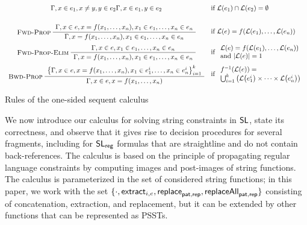 \begin{table}
\begin{gather*}
\begin{array}{cl}
      {\seqq{x \in e_1, x \not= y, y \in e_2}}
      {\seqq{x \in e_1, y \in e_2}}
      &
        \text{if~} \lang{e_1} \cap \lang{e_2} = \emptyset
      \\[4ex]
      \infer[Fwd-Prop]
      {\seqq{x = f(x_1, \ldots, x_n), x_1 \in e_1, \ldots, x_n \in e_n}}
      {\seqq{x \in e, x = f(x_1, \ldots, x_n), x_1 \in e_1, \ldots, x_n \in e_n}}
      &
        \text{if~} \lang{e} = f(\lang{e_1}, \ldots, \lang{e_n})
      \\[3ex]
      \infer[Fwd-Prop-Elim]
      {\seqq{x = f(x_1, \ldots, x_n), x_1 \in e_1, \ldots, x_n \in e_n}}
      {\seqq{x \in e, x_1 \in e_1, \ldots, x_n \in e_n}}
      &
        \text{if~}
        \begin{array}{l}
          \lang{e} = f(\lang{e_1}, \ldots, \lang{e_n})
          \\
          \text{and~} 
          |\lang{e}|= 1
          \end{array}
      \\[3ex]
      \infer[Bwd-Prop]
      {\seqq{x \in e, x = f(x_1, \ldots, x_n)}}
      {\big\{\seqq{x \in e, x = f(x_1, \ldots, x_n),
      x_1 \in e_1^i, \ldots, x_n \in e_n^i}\big\}_{i=1}^k}
      &
        \text{if~}
        \begin{array}{l}
          f^{-1}(\lang{e}) = \\
          \bigcup_{i=1}^k \big( \lang{e_1^i} \times \cdots \times \lang{e_n^i} \big)
          \end{array}
    \end{array}
  \end{gather*}
  
  \caption{Rules of the one-sided sequent calculus}
\end{table}


We now introduce our calculus for solving string constraints in
$\mathsf{SL}$, state its correctness, and observe that it gives rise to
decision procedures for several fragments, including for
$\mathsf{SL}_{\sf reg}$ formulas that are straightline and do not contain
back-references. The calculus is based on the principle of propagating
regular language constraints by computing images and post-images of
string functions. The calculus is parameterized in the set of
considered string functions; in this paper, we work with the set
$\{\cdot, \mathsf{extract}_{i, e}, \mathsf{replace}_{\mathsf{pat}, \mathsf{rep}}, \mathsf{replaceAll}_{\mathsf{pat},
  \mathsf{rep}}\}$ consisting of concatenation, extraction, and replacement,
but it can be extended by other functions that can be represented as
PSSTs.

